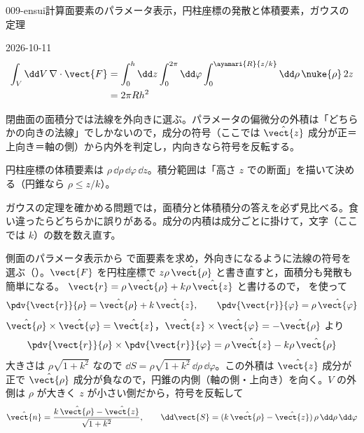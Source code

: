 \documentclass[uplatex,dvipdfmx,a4paper,11pt]{jsarticle}
\begin{document}
\begin{mondai}{009-ensui}{計算}{面要素のパラメータ表示，円柱座標の発散と体積要素，ガウスの定理}
\begin{kotaeutsushi}{2026-10-11}
\begin{align*}
\int_{V}\dd V\,\nabla\cdot\vect{F}&=\int_{0}^{h}\dd z\int_{0}^{2\pi}\dd\varphi\int_{0}^{\ayamari{R}{z/k}}\dd\rho\,\nuke{\rho}\,2z\\
&=2\pi Rh^{2}
\end{align*}
\end{kotaeutsushi}
\begin{kizuki}
\item 閉曲面の面積分では法線を外向きに選ぶ。パラメータの偏微分の外積は「どちらかの向きの法線」でしかないので，成分の符号（ここでは $\hat{\vect{z}}$ 成分が正＝上向き＝軸の側）から内外を判定し，内向きなら符号を反転する。
\item 円柱座標の体積要素は $\rho\,\dd\rho\,\dd\varphi\,\dd z$。積分範囲は「高さ $z$ での断面」を描いて決める（円錐なら $\rho\le z/k$）。
\item ガウスの定理を確かめる問題では，面積分と体積積分の答えを必ず見比べる。食い違ったらどちらかに誤りがある。成分の内積は成分ごとに掛けて，文字（ここでは $k$）の数を数え直す。
\end{kizuki}
\begin{tadashii}
\houshin 側面のパラメータ表示から  で面要素を求め，外向きになるように法線の符号を選ぶ（）。$\vect{F}$ を円柱座標で $z\rho\,\hat{\vect{\rho}}$ と書き直すと，面積分も発散も簡単になる。
\keisan {} $\vect{r} = \rho\,\hat{\vect{\rho}} + k\rho\,\hat{\vect{z}}$ と書けるので， を使って
\[ \pdv{\vect{r}}{\rho} = \hat{\vect{\rho}} + k\,\hat{\vect{z}}, \qquad \pdv{\vect{r}}{\varphi} = \rho\,\hat{\vect{\varphi}} \]
$\hat{\vect{\rho}}\times\hat{\vect{\varphi}} = \hat{\vect{z}}$，$\hat{\vect{z}}\times\hat{\vect{\varphi}} = -\hat{\vect{\rho}}$ より
\[ \pdv{\vect{r}}{\rho}\times\pdv{\vect{r}}{\varphi} = \rho\,\hat{\vect{z}} - k\rho\,\hat{\vect{\rho}} \]
大きさは $\rho\sqrt{1 + k^2}$ なので $\dd S = \rho\sqrt{1 + k^2}\,\dd\rho\,\dd\varphi$。この外積は $\hat{\vect{z}}$ 成分が正で $\hat{\vect{\rho}}$ 成分が負なので，円錐の内側（軸の側・上向き）を向く。$V$ の外側は $\rho$ が大きく $z$ が小さい側だから，符号を反転して
\[ \hat{\vect{n}} = \frac{k\,\hat{\vect{\rho}} - \hat{\vect{z}}}{\sqrt{1 + k^2}}, \qquad \dd\vect{S} = (k\,\hat{\vect{\rho}} - \hat{\vect{z}})\,\rho\,\dd\rho\,\dd\varphi \]


\end{tadashii}
\end{mondai}
\end{document}
